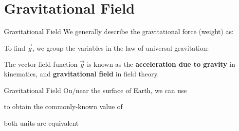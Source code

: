 \documentclass[12pt,compress,aspectratio=169]{beamer}
\begin{document}
\section{Gravitational Field}

\begin{frame}{Gravitational Field}
  We generally describe the gravitational force (weight) as:
  

  To find $\vec g$, we group the variables in the law of universal gravitation:
    

  The vector field function $\vec g$ is known as the \textbf{acceleration due
    to gravity} in kinematics, and \textbf{gravitational field} in field theory.
\end{frame}



\begin{frame}{Gravitational Field}
  On/near the surface of Earth, we can use

  
  to obtain the commonly-known value of


  both units are equivalent
\end{frame}
\end{document}

